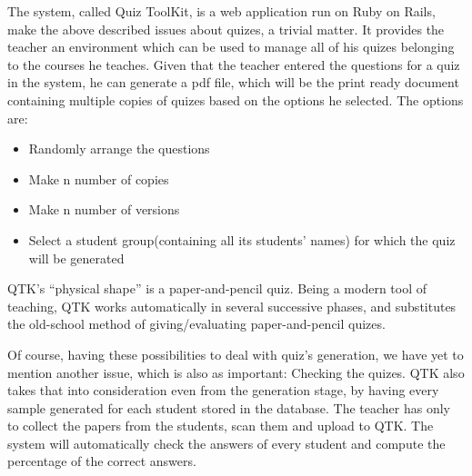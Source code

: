 The system, called Quiz ToolKit, is a web application run on Ruby on Rails, make the above described issues about quizes, a trivial matter. It provides the teacher an environment which can be used to manage all of his quizes belonging to the courses he teaches. Given that the teacher entered the questions for a quiz in the system, he can generate a pdf file, which will be the print ready document containing multiple copies of quizes based on the options he selected. The options are: 

\begin{itemize}
  \item Randomly arrange the questions
  \item Make n number of copies
  \item Make n number of versions
  \item Select a student group(containing all its students’ names) for which the quiz will be generated    
\end{itemize}

QTK's ``physical shape'' is a paper-and-pencil quiz. Being a modern tool of teaching, QTK works automatically in several successive phases, and substitutes the old-school method of giving/evaluating paper-and-pencil quizes. 

Of course, having these possibilities to deal with quiz’s generation, we have yet to mention another issue, which is also as important: Checking the quizes. QTK also takes that into consideration even from the generation stage, by having every sample generated for each student stored in the database. The teacher has only to collect the papers from the students, scan them and upload to QTK. The system will automatically check the answers of every student and compute the percentage of the correct answers.


\clearpage
